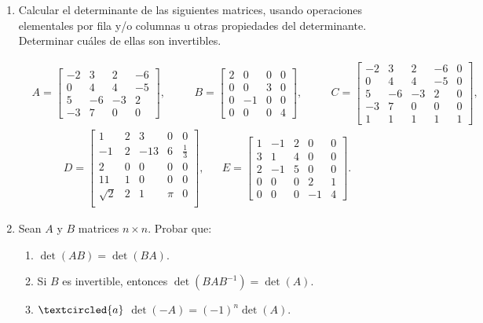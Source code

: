 \begin{enumerate}[topsep=6pt,itemsep=.4cm]
\item Calcular el determinante de las siguientes matrices, usando operaciones elementales por fila y/o columnas u otras propiedades del determinante. Determinar cuáles de ellas son invertibles.

\begin{align*}
&A=
\begin{bmatrix}
-2&3&2&-6\\ 0&4&4&-5\\ 5&-6&-3&2\\ -3&7&0&0 \end{bmatrix},\quad
&&B=\begin{bmatrix} 2&0&0&0\\ 0&0&3&0\\ 0&-1&0&0\\ 0&0&0&4\end{bmatrix},\quad
&&
C=\begin{bmatrix}
  -2&3&2&-6&0\\
0&4&4&-5&0\\
5&-6&-3&2&0\\
-3&7&0&0&0\\
1&1&1&1&1
  \end{bmatrix},
\end{align*}
\begin{align*}
D=\begin{bmatrix}
1&2&3&0&0\\
-1&2&-13&6&\frac{1}{3}\\
2&0&0&0&0\\
11&1&0&0&0\\
\sqrt{2}&2&1&\pi&0\\
\end{bmatrix},&&
E=\begin{bmatrix}
1&-1&2&0&0\\ 3&1&4&0&0\\ 2&-1&5&0&0 \\0&0&0&2&1\\ 0&0&0&-1&4
\end{bmatrix}.
\end{align*}

\item Sean $A$ y  $B$ matrices $n \times n$. Probar que:


\begin{enumerate}
	\item $\det(AB) = \det (BA)$.
	\item Si $B$ es invertible, entonces $\det(B A B^{-1}) = \det (A)$.
	\item\label{-A} $\textcircled{a}$ $\det(-A) = (-1)^n\det (A)$.
\end{enumerate}



\end{enumerate}
